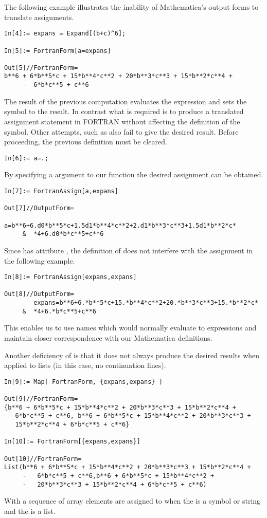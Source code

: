 \documentclass [12pt,twoside]{article}
\begin{document}
\noindent
The following example illustrates the inability of Mathematica's output forms to
translate assignments.

\begin{verbatim}
In[4]:= expans = Expand[(b+c)^6];

In[5]:= FortranForm[a=expans]

Out[5]//FortranForm=
b**6 + 6*b**5*c + 15*b**4*c**2 + 20*b**3*c**3 + 15*b**2*c**4 + 
     -  6*b*c**5 + c**6
\end{verbatim}
The result of the previous computation evaluates the expression
 and sets the symbol  to the result. In contrast what is
required is to produce a translated assignment statement in FORTRAN
without affecting the definition of the symbol. Other attempts, such as
 also fail to give the desired result.
Before proceeding, the previous definition must be cleared.

\begin{verbatim}
In[6]:= a=.;
\end{verbatim}
By specifying a  argument to our  function the
desired assignment can be obtained.

\begin{verbatim}
In[7]:= FortranAssign[a,expans]

Out[7]//OutputForm=
        a=b**6+6.d0*b**5*c+1.5d1*b**4*c**2+2.d1*b**3*c**3+1.5d1*b**2*c*
     &  *4+6.d0*b*c**5+c**6
\end{verbatim}
Since  has attribute , the definition of
 does not interfere with the assignment in the following example.

\begin{verbatim}
In[8]:= FortranAssign[expans,expans]

Out[8]//OutputForm=
        expans=b**6+6.*b**5*c+15.*b**4*c**2+20.*b**3*c**3+15.*b**2*c*
     &  *4+6.*b*c**5+c**6
\end{verbatim}
This enables us to use  names which would normally evaluate to expressions and
maintain closer correspondence with our Mathematica definitions.

\noindent
Another deficiency of  is that it does not always produce the desired
results when applied to lists (in this case, no continuation lines).

\begin{verbatim}
In[9]:= Map[ FortranForm, {expans,expans} ]

Out[9]//FortranForm=
{b**6 + 6*b**5*c + 15*b**4*c**2 + 20*b**3*c**3 + 15*b**2*c**4 +
   6*b*c**5 + c**6, b**6 + 6*b**5*c + 15*b**4*c**2 + 20*b**3*c**3 +
   15*b**2*c**4 + 6*b*c**5 + c**6}

In[10]:= FortranForm[{expans,expans}]

Out[10]//FortranForm=
List(b**6 + 6*b**5*c + 15*b**4*c**2 + 20*b**3*c**3 + 15*b**2*c**4 + 
     -   6*b*c**5 + c**6,b**6 + 6*b**5*c + 15*b**4*c**2 + 
     -   20*b**3*c**3 + 15*b**2*c**4 + 6*b*c**5 + c**6)
\end{verbatim}
With  a sequence of array elements are assigned to when the
 is a symbol or string and the  is a list.
\end{document}
